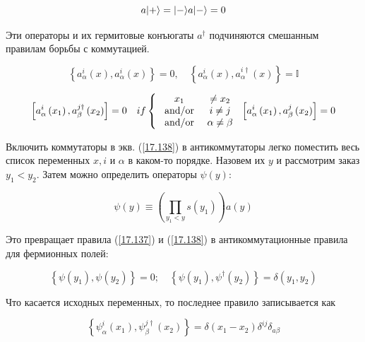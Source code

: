 \documentclass[main.tex]{subfiles}
\begin{document}
\begin{equation}\label{17.136}
a|+\rangle=|-\rangle \\
a|-\rangle= 0
\end{equation}

Эти операторы и их гермитовые конъюгаты $a^{\dagger}$ подчиняются смешанным правилам борьбы с коммутацией.

\begin{equation}\label{17.137}
\left\{a_{\alpha}^{i}(x), a_{\alpha}^{i}(x)\right\}=0, \quad\left\{a_{\alpha}^{i}(x), a_{\alpha}^{i \dagger}(x)\right\}=\mathbb{I}
\end{equation}

\begin{equation}\label{17.138}
\left[a_{\alpha}^{i}\left(x_{1}\right), a_{\beta}^{j \dagger}\left(x_{2}\right)\right]=0 \quad if\\
\left\{\begin{array}{cc}{x_{1}} & {\neq x_{2}} \\ {\text { and/or }} & {i \neq j} \\ {\text { and/or }} & {\alpha \neq \beta}\end{array}\right.\\
\left[a_{\alpha}^{i}\left(x_{1}\right), a_{\beta}^{j}\left(x_{2}\right)\right]=0
\end{equation}


Включить коммутаторы в экв. (\ref{17.138}) в антикоммутаторы легко поместить весь список переменных $x, i$ и $\alpha$ в каком-то порядке. Назовем их $y$ и рассмотрим заказ $y_{1}<y_{2} .$ Затем можно определить операторы $\psi(y)$:

\begin{equation}\label{17.139}
\psi(y) \equiv\left(\prod_{y_{1}<y} s\left(y_{1}\right)\right) a(y)
\end{equation}

Это превращает правила (\ref{17.137}) и (\ref{17.138}) в антикоммутационные правила для фермионных полей:

\begin{equation}\label{17.140}
\left\{\psi\left(y_{1}\right), \psi\left(y_{2}\right)\right\}=0 ; \quad\left\{\psi\left(y_{1}\right), \psi^{\dagger}\left(y_{2}\right)\right\}=\delta\left(y_{1}, y_{2}\right)
\end{equation}

Что касается исходных переменных, то последнее правило записывается как

\begin{equation}\label{17.141}
\left\{\psi_{\alpha}^{i}\left(x_{1}\right), \psi_{\beta}^{j \dagger}\left(x_{2}\right)\right\}=\delta\left(x_{1}-x_{2}\right) \delta^{i j} \delta_{a \beta}
\end{equation}
\end{document}
